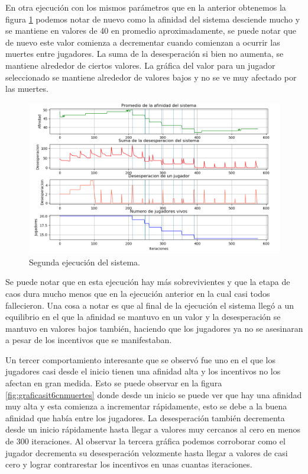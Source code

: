\documentclass[11pt,letterpaper]{article}
\begin{document}
En otra ejecución con los mismos parámetros que en la anterior obtenemos la figura 
\ref{fig:graficasit5cnmuertes} podemos notar de nuevo como la afinidad del sistema 
desciende mucho y se mantiene en valores de 40 en promedio aproximadamente, se puede
notar que de nuevo este valor comienza a decrementar cuando comienzan a ocurrir
las muertes entre jugadores. La suma de la desesperación si bien no aumenta, se 
mantiene alrededor de ciertos valores. La gráfica del valor para un jugador seleccionado se mantiene alrededor de valores bajos y no se ve muy afectado por las muertes. 

\begin{figure}[h!]
	\centering
	\includegraphics[width=0.7\linewidth]{Graficas_It_5cnMuertes}
	\caption{Segunda ejecución del sistema.}
	\label{fig:graficasit5cnmuertes}
\end{figure}

Se puede notar que en esta ejecución hay más sobrevivientes y que la etapa 
de caos dura mucho menos que en la ejecución anterior en la cual casi todos 
fallecieron. Una cosa a notar es que al final de la ejecución el sistema llegó
a un equilibrio en el que la afinidad se mantuvo en un valor y la desesperación se mantuvo en valores bajos también, haciendo que los jugadores ya no se asesinaran a
pesar de los incentivos que se manifestaban.


 
Un tercer comportamiento interesante que se observó fue uno en el que los jugadores 
casi desde el inicio tienen una afinidad alta y los incentivos no los afectan en 
gran medida. Esto se puede observar en la figura \ref{fig:graficasit6cnmuertes} 
donde desde un inicio se puede ver que hay una afinidad muy alta y esta comienza a 
incrementar rápidamente, esto se debe a la buena afinidad que había entre los 
jugadores. La desesperación también decrementa desde un inicio rápidamente hasta 
llegar a valores muy cercanos al cero en menos de 300 iteraciones. Al observar la tercera gráfica podemos corroborar como el jugador decrementa su desesperación 
velozmente hasta llegar a valores de casi cero y lograr contrarestar los incentivos
en unas cuantas iteraciones. 
\end{document}
